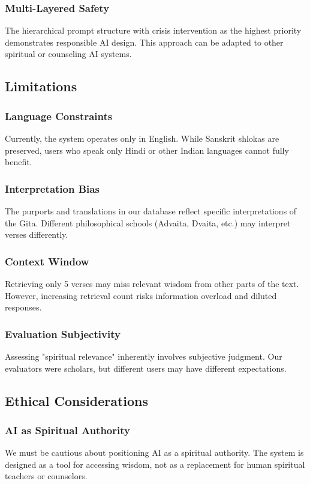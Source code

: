 \documentclass[conference]{IEEEtran}
\begin{document}
\subsubsection{Multi-Layered Safety}
The hierarchical prompt structure with crisis intervention as the highest priority demonstrates responsible AI design. This approach can be adapted to other spiritual or counseling AI systems.

\subsection{Limitations}

\subsubsection{Language Constraints}
Currently, the system operates only in English. While Sanskrit shlokas are preserved, users who speak only Hindi or other Indian languages cannot fully benefit.

\subsubsection{Interpretation Bias}
The purports and translations in our database reflect specific interpretations of the Gita. Different philosophical schools (Advaita, Dvaita, etc.) may interpret verses differently.

\subsubsection{Context Window}
Retrieving only 5 verses may miss relevant wisdom from other parts of the text. However, increasing retrieval count risks information overload and diluted responses.

\subsubsection{Evaluation Subjectivity}
Assessing "spiritual relevance" inherently involves subjective judgment. Our evaluators were scholars, but different users may have different expectations.

\subsection{Ethical Considerations}

\subsubsection{AI as Spiritual Authority}
We must be cautious about positioning AI as a spiritual authority. The system is designed as a tool for accessing wisdom, not as a replacement for human spiritual teachers or counselors.
\end{document}
